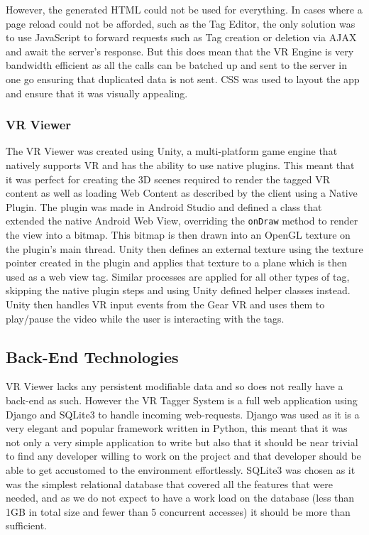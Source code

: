 \documentclass[12pt]{report}
\newcommand{\inlinecode}{\texttt}
\begin{document}
However, the generated HTML could not be used for everything. In cases where a page reload could not be afforded, such as the Tag Editor, the only solution was to use JavaScript to forward requests such as Tag creation or deletion via AJAX and await the server's response. But this does mean that the VR Engine is very bandwidth efficient as all the calls can be batched up and sent to the server in one go ensuring that duplicated data is not sent. CSS was used to layout the app and ensure that it was visually appealing. 

\subsubsection{VR Viewer}
The VR Viewer was created using Unity, a multi-platform game engine that natively supports VR and has the ability to use native plugins. This meant that it was perfect for creating the 3D scenes required to render the tagged VR content as well as loading Web Content as described by the client using a Native Plugin. The plugin was made in Android Studio and defined a class that extended the native Android Web View, overriding the \inlinecode{onDraw} method to render the view into a bitmap. This bitmap is then drawn into an OpenGL texture on the plugin's main thread. Unity then defines an external texture using the texture pointer created in the plugin and applies that texture to a plane which is then used as a web view tag. Similar processes are applied for all other types of tag, skipping the native plugin steps and using Unity defined helper classes instead. Unity then handles VR input events from the Gear VR and uses them to play/pause the video while the user is interacting with the tags. 

\subsection{Back-End Technologies}
VR Viewer lacks any persistent modifiable data and so does not really have a back-end as such. However the VR Tagger System is a full web application using Django and SQLite3 to handle incoming web-requests. Django was used as it is a very elegant and popular framework written in Python, this meant that it was not only a very simple application to write but also that it should be near trivial to find any developer willing to work on the project and that developer should be able to get accustomed to the environment effortlessly. SQLite3 was chosen as it was the simplest relational database that covered all the features that were needed, and as we do not expect to have a work load on the database (less than 1GB in total size and fewer than 5 concurrent accesses) it should be more than sufficient. 
\end{document}
